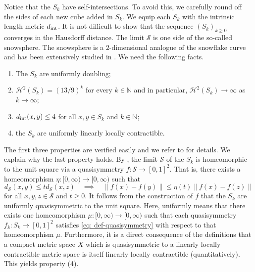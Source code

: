 \documentclass{amsart}
\numberwithin{equation}{section}
\newcommand{\N}{\mathbb{N}}
\newcommand{\Ha}{\mathcal{H}}
\newcommand{\norm}[1]{\lVert#1\rVert}
\begin{document}
         
         Notice that the $S_k$ have self-intersections. To avoid this, we carefully round off the sides of each new cube added in $S_k$. We equip each $S_k$ with the intrinsic length metric $d_{\textup{int}}$. It is not difficult to show that the sequence $(S_k)_{k\geq 0}$ converges in the Hausdorff distance. The limit $\mathcal{S}$ is one side of the so-called snowsphere. The snowsphere is a $2$-dimensional analogue of the snowflake curve and has been extensively studied in \cite{meyer-snowsphere-1, meyer-snowsphere-2}. We need the following facts. 
                \begin{enumerate}
                    \item The $S_k$ are uniformly doubling; 
                    \item $\Ha^2(S_k) = \left(13/9\right)^k$ for every $k \in \N$ and in particular, $\Ha^2(S_k) \to \infty$ as $k \to \infty$;
                    \item $d_{\textup{int}}(x,y) \leq 4$ for all $x,y\in S_k$ and $k\in \N$;
                    \item the $S_k$ are uniformly linearly locally contractible.
                \end{enumerate}
                The first three properties are verified easily and we refer to \cite{meyer-snowsphere-1} for details. We explain why the last property holds. By \cite[Theorem 5.1]{meyer-snowsphere-1}, the limit $\mathcal{S}$ of the $S_k$ is homeomorphic to the unit square via a quasisymmetry $f\colon \mathcal{S}\to [0,1]^2$. That is, there exists a homeomorphism $\eta\colon [0,\infty) \to [0,\infty)$ such that 
                \begin{equation}\label{eq: def-quasisymmetry}
                    d_\mathcal{S}(x,y)\leq t d_\mathcal{S}(x,z)\quad \implies\quad \norm{f(x)-f(y)} \leq \eta(t) \norm{f(x)-f(z)}
                \end{equation}
                for all $x,y,z \in \mathcal{S}$ and $t\geq 0$. It follows from the construction of $f$ that the $S_k$ are uniformly quasisymmetric to the unit square. Here, uniformly means that there exists one homeomorphism $\mu\colon [0,\infty) \to [0,\infty)$ such that each quasisymmetry $f_k \colon S_k \to [0,1]^2$ satisfies \eqref{eq: def-quasisymmetry} with respect to that homeomorphism $\mu$. Furthermore, it is a direct consequence of the definitions that a compact metric space $X$ which is quasisymmetric to a linearly locally contractible metric space is itself linearly locally contractible (quantitatively). This yields property (4). 
\end{document}
